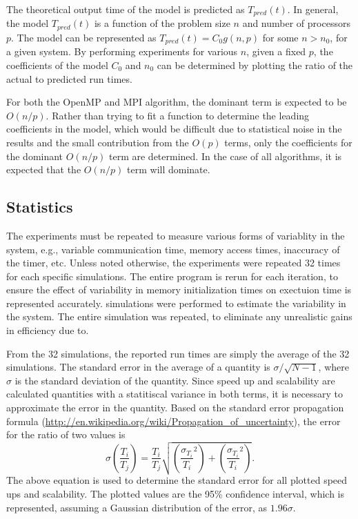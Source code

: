 \documentclass[12pt]{article}
\begin{document}
{{{The theoretical output time of the model is predicted as $T_{pred}(t)$. In general,
the model $T_{pred}(t)$ is a function of the problem size $n$ and number of processors $p$.
The model can be represented as $T_{pred}(t) = C_0 g(n,p)$ for some $n>n_0$, for a
given system.  By performing experiments for various $n$, given a fixed $p$, the
coefficients of the model $C_0$ and $n_0$ can be determined by plotting the ratio of
the actual to predicted run times.  

For both the OpenMP and MPI algorithm, the dominant term is expected to be $O(n/p)$.
Rather than trying to fit a function to determine the leading coefficients in the
model, which would be difficult due to statistical noise in the results and the small
contribution from the $O(p)$ terms, only the coefficients for the dominant $O(n/p)$
term are determined.  In the case of all algorithms, it is expected
that the $O(n/p)$ term will dominate.



\subsection{Statistics}

The experiments must be repeated to measure various forms of variablity in the
system, e.g., variable communication time, memory access times, inaccuracy of the
timer, etc.  Unless noted otherwise, the experiments were repeated 32 times for each
specific simulations.  The entire program is rerun for each iteration, to ensure the
effect of variability in memory initialization times on exectuion time is represented
accurately.  simulations were performed to
estimate the variability in the system.  The entire simulation was repeated, to
eliminate any unrealistic gains in efficiency due to.

From the 32 simulations, the reported run times are simply the average of the 32
simulations. The standard error in the average of a quantity is $\sigma/\sqrt{N-1}$,
where $\sigma$ is the standard deviation of the quantity.  Since speed up and
scalability are calculated quantities with a statitiscal variance in both terms, it
is necessary to approximate the error in the quantity.  
Based on the standard error propagation formula
(\url{http://en.wikipedia.org/wiki/Propagation_of_uncertainty}), the error for the
ratio of two values is
\begin{equation}
    \sigma \left( \frac{T_i}{T_j} \right) = \frac{T_i}{T_j}
    \sqrt{\left(\frac{\sigma_{T_i}}{T_i}^2\right) + 
    \left(\frac{\sigma_{T_i}}{T_i}^2\right)}
    \label{err}.
\end{equation}
The above equation is used to determine the standard error for all plotted speed ups
and scalability.  The plotted values are the 95\% confidence interval, which is represented, assuming a
Gaussian distribution of the error, as $1.96 \sigma$.

}}}
\end{document}
